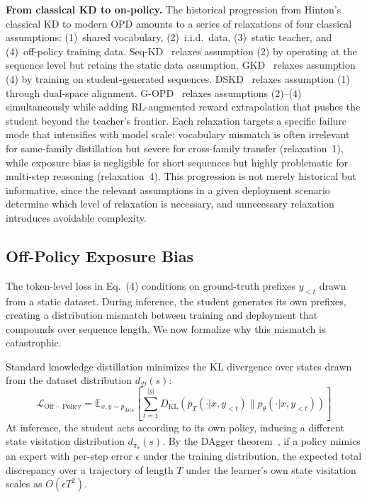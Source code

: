 \documentclass{article} %
\newcommand{\E}{\mathbb{E}}
\newcommand{\KL}{D_{\mathrm{KL}}}
\newcommand{\ptheta}{p_\theta}
\newcommand{\pteacher}{p_T}
\newcommand{\pdata}{p_{\mathrm{data}}}
\newcommand{\loss}{\mathcal{L}}
\begin{document}
\textbf{From classical KD to on-policy.} The historical progression from Hinton's classical KD to modern OPD amounts to a series of relaxations of four classical assumptions: (1)~shared vocabulary, (2)~i.i.d.\ data, (3)~static teacher, and (4)~off-policy training data. Seq-KD~\citep{1606.07947} relaxes assumption (2) by operating at the sequence level but retains the static data assumption. GKD~\citep{2306.13649} relaxes assumption (4) by training on student-generated sequences. DSKD~\citep{2504.11426} relaxes assumption (1) through dual-space alignment. G-OPD~\citep{2602.12125} relaxes assumptions (2)--(4) simultaneously while adding RL-augmented reward extrapolation that pushes the student beyond the teacher's frontier. Each relaxation targets a specific failure mode that intensifies with model scale: vocabulary mismatch is often irrelevant for same-family distillation but severe for cross-family transfer (relaxation~1), while exposure bias is negligible for short sequences but highly problematic for multi-step reasoning (relaxation~4). This progression is not merely historical but informative, since the relevant assumptions in a given deployment scenario determine which level of relaxation is necessary, and unnecessary relaxation introduces avoidable complexity.

\subsection{Off-Policy Exposure Bias}

The token-level loss in Eq.~(4) conditions on ground-truth prefixes $y_{<t}$ drawn from a static dataset. During inference, the student generates its own prefixes, creating a distribution mismatch between training and deployment that compounds over sequence length. We now formalize why this mismatch is catastrophic.

Standard knowledge distillation minimizes the KL divergence over states drawn from the dataset distribution $d_{\mathcal{D}}(s)$:
\begin{equation}
    \loss_{\mathrm{Off-Policy}} = \E_{x, y \sim \pdata} \left[ \sum_{t=1}^{|y|} \KL(\pteacher(\cdot | x, y_{<t}) \parallel \ptheta(\cdot | x, y_{<t})) \right]
\end{equation}
At inference, the student acts according to its own policy, inducing a different state visitation distribution $d_{\pi_\theta}(s)$. By the DAgger theorem~\citep{1011.0686}, if a policy mimics an expert with per-step error $\epsilon$ under the training distribution, the expected total discrepancy over a trajectory of length $T$ under the learner's own state visitation scales as $O(\epsilon T^2)$.
\end{document}
